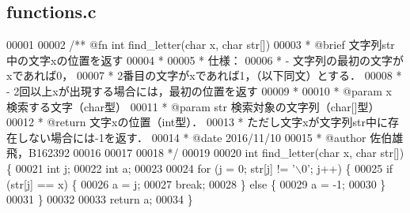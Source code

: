 \subsection{functions.\-c}

\begin{DoxyCode}
00001 \textcolor{comment}{}
00002 \textcolor{comment}{/** @fn int find\_letter(char x, char str[])}
00003 \textcolor{comment}{ *  @brief  文字列str中の文字xの位置を返す}
00004 \textcolor{comment}{ *}
00005 \textcolor{comment}{ *  仕様：}
00006 \textcolor{comment}{ *  - 文字列の最初の文字がxであれば0，}
00007 \textcolor{comment}{ *    2番目の文字がxであれば1，（以下同文）とする．}
00008 \textcolor{comment}{ *  - 2回以上xが出現する場合には，最初の位置を返す}
00009 \textcolor{comment}{ *}
00010 \textcolor{comment}{ *  @param  x 検索する文字（char型）}
00011 \textcolor{comment}{ *  @param  str 検索対象の文字列（char[]型）}
00012 \textcolor{comment}{ *  @return 文字xの位置（int型）．}
00013 \textcolor{comment}{ *          ただし文字xが文字列str中に存在しない場合には-1を返す．}
00014 \textcolor{comment}{ *  @date   2016/11/10}
00015 \textcolor{comment}{ *  @author 佐伯雄飛，B162392}
00016 \textcolor{comment}{}
00017 \textcolor{comment}{}
00018 \textcolor{comment}{ */}
00019 
00020 \textcolor{keywordtype}{int} find_letter(\textcolor{keywordtype}{char} x, \textcolor{keywordtype}{char} str[]) \{
00021   \textcolor{keywordtype}{int} j;
00022   \textcolor{keywordtype}{int} a;
00023 
00024   \textcolor{keywordflow}{for} (j = 0; str[j] != \textcolor{charliteral}{'\(\backslash\)0'}; j++) \{
00025     \textcolor{keywordflow}{if} (str[j] == x) \{
00026       a = j;
00027       \textcolor{keywordflow}{break};
00028     \} \textcolor{keywordflow}{else} \{
00029       a = -1;
00030     \}
00031   \}
00032 
00033   \textcolor{keywordflow}{return} a;
00034 \}
\end{DoxyCode}
